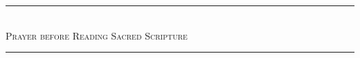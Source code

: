\fancyhead[RE,LO]{}
\fancyhead[LE,RO]{}
\onecolumn
\vspace*{50ex}
\begin{center}
	\rule{15em}{.25mm}\\
	\vspace{1.5ex}
	{\Large{\scshape Prayer before Reading Sacred Scripture}}
	\par
	\rule{15em}{.25mm}
\end{center}
\vfill
\twocolumn